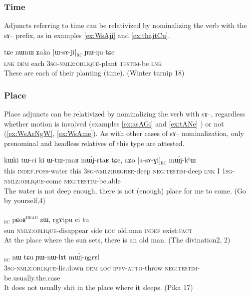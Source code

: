 \documentclass[oldfontcommands,oneside,a4paper,11pt]{article}
\newcommand{\ipa}[1]{{\phon #1}} %
\newcommand{\tete}{\textsuperscript{\textsc{head}}}
\newcommand{\rc}{\textsubscript{\textsc{rc}}}
\begin{document}
\subsubsection{Time} \label{sec:rel:time}

Adjuncts referring to   time can be relativized by nominalizing the verb with the \ipa{sɤ}-- prefix, as in examples \ref{ex:WsAji} and \ref{ex:thajtCu}.

\begin{exe}
   \ex \label{ex:WsAji}
   \ipa{tɕe} 	\ipa{nɯnɯ} 	\ipa{ʑaka} 	[\ipa{ɯ-sɤ-ji}]\rc{} 	\ipa{ɲɯ-ŋu} 	\ipa{tɕe} \\
   \textsc{lnk} \textsc{dem} each \textsc{3sg-nmlz:oblique}-plant \textsc{testim}-be \textsc{lnk} \\
\glt These are each of their planting (time). (Winter turnip 18)
\end{exe}


\subsubsection{Place}
Place adjuncts can be relativized by nominalizing the verb with \ipa{sɤ}--, regardless whether motion is involved (examples \ref{ex:asAGi} and \ref{ex:tANe} )  or not (\ref{ex:WsArNgW}, \ref{ex:WsAme}). As with other cases of \ipa{sɤ}-- nominalization, only prenominal and headless relatives of this type are attested.

\begin{exe}
   \ex \label{ex:asAGi}
 \gll
\ipa{kɯki}   	\ipa{tɯ-ci}   	\ipa{ki}   	\ipa{ɯ-tɯ-rnaʁ}   	\ipa{mɯ́j-rtaʁ}   	\ipa{tɕe,}   	\ipa{aʑo}   	[\ipa{a-sɤ-ɣi}]\rc{}   	\ipa{mɯ́j-kʰɯ}   \\
this \textsc{indef.poss}-water this \textsc{3sg-nmlz:degree}-deep \textsc{neg:testim}-deep \textsc{lnk} I \textsc{1sg-nmlz:oblique}-come \textsc{neg:testim}-be.able \\
\glt The water is not deep enough, there is not (enough) place for me to come. (Go by yourself,4)
\end{exe}


\begin{exe}
   \ex \label{ex:tANe}
 \gll [\ipa{tɤŋe}   	\ipa{sɤ-ɕqʰlɤt}]\rc{}   	\ipa{pɕoʁ}\tete{}   	\ipa{zɯ,}   	\ipa{rgɤtpu}   	\ipa{ci}   	\ipa{tu}   \\
sun \textsc{nmlz:oblique}-disappear side \textsc{loc} old.man \textsc{indef} exist:\textsc{fact} \\
\glt At the place where the sun sets, there is an old man. (The divination2, 2)
\end{exe}
\begin{exe}
   \ex \label{ex:WsArNgW}
 \gll
[\ipa{ɯ-sɤ-rŋgɯ}]\rc{}   	\ipa{nɯ} \ipa{tɕu}   	\ipa{ɲɯ-nɯ-lɤt}   	\ipa{mɯ́j-ŋgrɤl}   \\
\textsc{3sg-nmlz:oblique}-lie.down \textsc{dem} \textsc{loc} \textsc{ipfv-auto}-throw \textsc{neg:testim}-be.usually.the.case \\
\glt  It  does not usually shit in the place where it sleeps. (Pika 17)
\end{exe}
\end{document}
